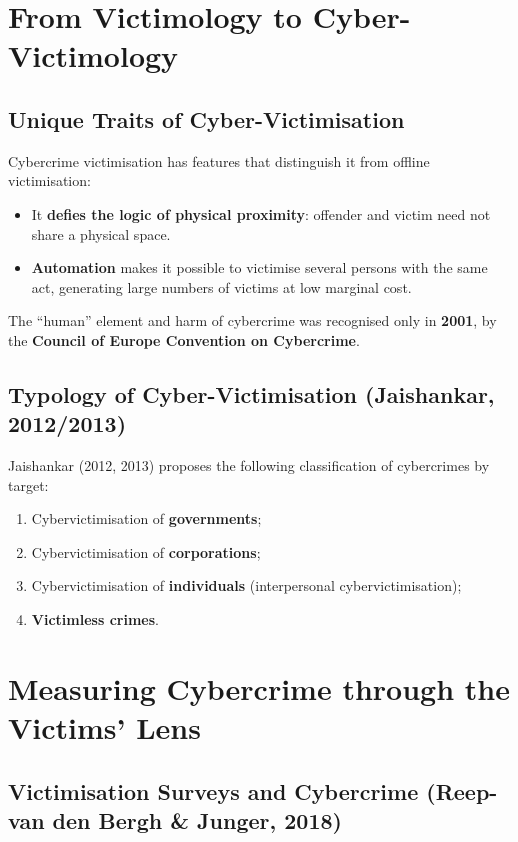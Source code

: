 \documentclass[11pt,a4paper,openany]{report}
\theoremstyle{definition}
\theoremstyle{plain}
\theoremstyle{remark}
\begin{document}
\section{From Victimology to Cyber-Victimology}

\subsection{Unique Traits of Cyber-Victimisation}

Cybercrime victimisation has features that distinguish it from offline victimisation:
\begin{itemize}
    \item It \textbf{defies the logic of physical proximity}: offender and victim need not share a physical space.
    \item \textbf{Automation} makes it possible to victimise several persons with the same act, generating large numbers of victims at low marginal cost.
\end{itemize}

The ``human'' element and harm of cybercrime was recognised only in \textbf{2001}, by the \textbf{Council of Europe Convention on Cybercrime}.

\subsection{Typology of Cyber-Victimisation (Jaishankar, 2012/2013)}

Jaishankar (2012, 2013) proposes the following classification of cybercrimes by target:
\begin{enumerate}
    \item Cybervictimisation of \textbf{governments};
    \item Cybervictimisation of \textbf{corporations};
    \item Cybervictimisation of \textbf{individuals} (interpersonal cybervictimisation);
    \item \textbf{Victimless crimes}.
\end{enumerate}

\section{Measuring Cybercrime through the Victims' Lens}

\subsection{Victimisation Surveys and Cybercrime (Reep-van den Bergh \& Junger, 2018)}
\end{document}
